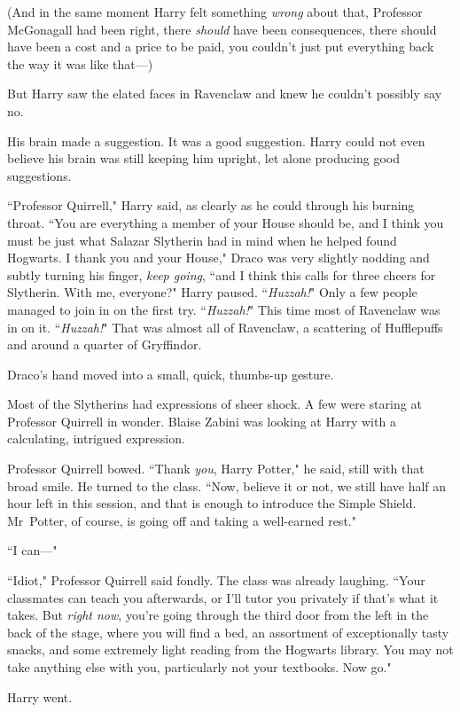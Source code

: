 (And in the same moment Harry felt something \emph{wrong} about that, Professor McGonagall had been right, there \emph{should} have been consequences, there should have been a cost and a price to be paid, you couldn't just put everything back the way it was like that—)

But Harry saw the elated faces in Ravenclaw and knew he couldn't possibly say no.

His brain made a suggestion. It was a good suggestion. Harry could not even believe his brain was still keeping him upright, let alone producing good suggestions.

``Professor Quirrell," Harry said, as clearly as he could through his burning throat. ``You are everything a member of your House should be, and I think you must be just what Salazar Slytherin had in mind when he helped found Hogwarts. I thank you and your House," Draco was very slightly nodding and subtly turning his finger, \emph{keep going}, ``and I think this calls for three cheers for Slytherin. With me, everyone?" Harry paused. ``\emph{Huzzah!}" Only a few people managed to join in on the first try. ``\emph{Huzzah!}" This time most of Ravenclaw was in on it. ``\emph{Huzzah!}" That was almost all of Ravenclaw, a scattering of Hufflepuffs and around a quarter of Gryffindor.

Draco's hand moved into a small, quick, thumbs-up gesture.

Most of the Slytherins had expressions of sheer shock. A few were staring at Professor Quirrell in wonder. Blaise Zabini was looking at Harry with a calculating, intrigued expression.

Professor Quirrell bowed. ``Thank \emph{you}, Harry Potter," he said, still with that broad smile. He turned to the class. ``Now, believe it or not, we still have half an hour left in this session, and that is enough to introduce the Simple Shield. Mr~Potter, of course, is going off and taking a well-earned rest."

``I can—"

``Idiot," Professor Quirrell said fondly. The class was already laughing. ``Your classmates can teach you afterwards, or I'll tutor you privately if that's what it takes. But \emph{right now}, you're going through the third door from the left in the back of the stage, where you will find a bed, an assortment of exceptionally tasty snacks, and some extremely light reading from the Hogwarts library. You may not take anything else with you, particularly not your textbooks. Now go."

Harry went.

